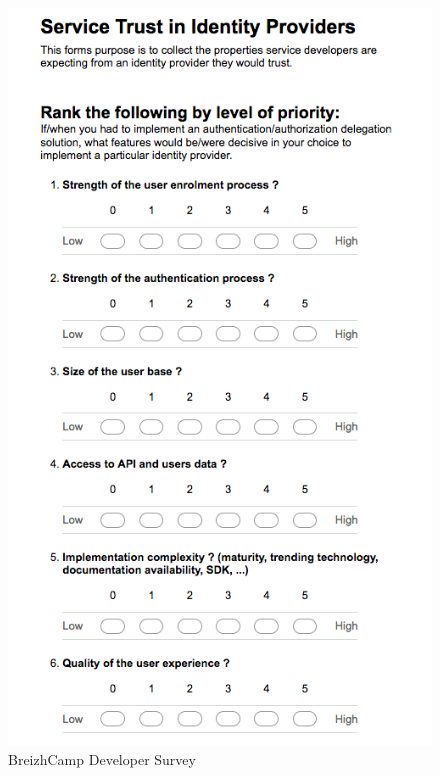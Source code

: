 \begin{figure}
    \includegraphics[scale=0.55, angle =90 ]{images/surveyBzhCamp1}
    \caption{BreizhCamp Developer Survey}
    \label{bzhCamp}
\end{figure}

